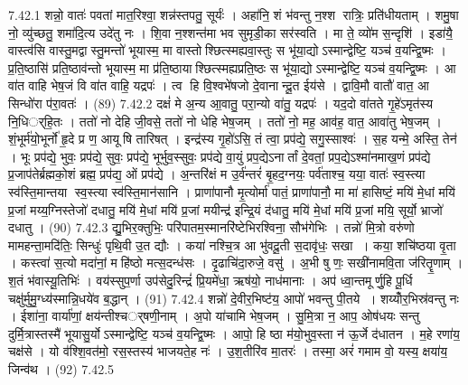 7.42.1
शन्नो॒ वातः॑ पवतां मात॒रिश्वा॒ शन्न॑स्तपतु॒ सूर्यः॑ । अहा॑नि॒ शं भ॑वन्तु न॒श्श रात्रिः॒ प्रति॑धीयताम् । शमु॒षा नो॒ व्यु॑च्छतु॒ शमा॑दि॒त्य उदे॑तु नः । शि॒वा न॒श्शन्त॑मा भव सुमृडी॒का सर॑स्वति । मा ते॒ व्यो॑म स॒न्दृशि॑ । इडा॑यै॒ वास्त्व॑सि वास्तु॒मद्वास्तु॒मन्तो॑ भूयास्म॒ मा वास्तोश्छित्स्मह्यवा॒स्तुः स भू॑या॒द्योऽस्मान्द्वेष्टि॒ यञ्च॑ व॒यन्द्वि॒ष्मः । प्र॒ति॒ष्ठासि॑ प्रति॒ष्ठाव॑न्तो भूयास्म॒ मा प्र॑ति॒ष्ठायाश्छित्स्मह्यप्रति॒ष्ठः स भू॑या॒द्योऽस्मान्द्वेष्टि॒ यञ्च॑ व॒यन्द्वि॒ष्मः । आ वा॑त वाहि भेष॒जं वि वा॑त वाहि॒ यद्रपः॑ । त्व हि वि॒श्वभे॑षजो दे॒वानान्दू॒त ईय॑से । द्वावि॒मौ वातौ॑ वात॒ आ सिन्धो॑रा प॑रा॒वतः॑ । (89)
7.42.2
दक्षं॑ मे अ॒न्य आ॒वातु॒ परा॒न्यो वा॑तु॒ यद्रपः॑ । यद॒दो वा॑तते गृ॒हे॑ऽमृत॑स्य नि॒धिर््हि॒तः । ततो॑ नो देहि जी॒वसे॒ ततो॑ नो धेहि भेष॒जम् । ततो॑ नो॒ मह॒ आव॑ह॒ वात॒ आवा॑तु भेष॒जम् । शं॒भूर्म॑यो॒भूर्नो॑ हृ॒दे प्र ण॒ आयूषि तारिषत् । इन्द्र॑स्य गृ॒हो॑ऽसि॒ तं त्वा॒ प्रप॑द्ये॒ सगु॒स्साश्वः॑ । स॒ह यन्मे॒ अस्ति॒ तेन॑ । भूः प्रप॑द्ये॒ भुवः॒ प्रप॑द्ये॒ सुवः॒ प्रप॑द्ये॒ भूर्भुव॒स्सुवः॒ प्रप॑द्ये वा॒युं प्रप॒द्येऽनार्तां दे॒वतां॒ प्रप॒द्येऽश्मा॑नमाख॒णं प्रप॑द्ये प्र॒जाप॑तेर्ब्रह्मको॒शं ब्रह्म॒ प्रप॑द्य॒ ओं प्रप॑द्ये । अ॒न्तरि॑क्षं म उ॒र्व॑न्तरं॑ बृ॒हद॒ग्नयः॒ पर्व॑ताश्च॒ यया॒ वातः॑ स्व॒स्त्या स्व॑स्ति॒मान्तया स्व॒स्त्या स्व॑स्ति॒मान॑सानि । प्राणा॑पानौ मृ॒त्योर्मा॑ पातं॒ प्राणा॑पानौ॒ मा मा॑ हासिष्टं॒ मयि॑ मे॒धां मयि॑ प्र॒जां मय्य॒ग्निस्तेजो॑ दधातु॒ मयि॑ मे॒धां मयि॑ प्र॒जां मयीन्द्र॑ इन्द्रि॒यं द॑धातु॒ मयि॑ मे॒धां मयि॑ प्र॒जां मयि॒ सूर्यो॒ भ्राजो॑ दधातु । (90)
7.42.3
द्यु॒भिर॒क्तुभिः॒ परि॑पातम॒स्मानरि॑ष्टेभिरश्विना॒ सौभ॑गेभिः । तन्नो॑ मि॒त्रो वरु॑णो मामहन्ता॒मदि॑तिः॒ सिन्धुः॑ पृथि॒वी उ॒त द्यौः । कया॑ नश्चि॒त्र आ भु॑वदू॒ती स॒दावृ॑धः॒ सखा । कया॒ शचि॑ष्ठया वृ॒ता । कस्त्वा॑ स॒त्यो मदा॑नां॒ महि॑ष्ठो मत्स॒दन्ध॑सः । दृ॒ढाचि॑दा॒रुजे॒ वसु॑ । अ॒भी षु णः॒ सखी॑नामवि॒ता ज॑रितॄ॒णाम् । श॒तं भ॑वास्यू॒तिभिः॑ । वय॑स्सुप॒र्णा उप॑सेदु॒रिन्द्रं॑ प्रि॒यमे॑धा॒ ऋष॑यो॒ नाध॑मानाः । अप॑ ध्वा॒न्तमूर्णु॒हि पू॒र्धि चक्षु॑र्मुमु॒ग्ध्य॑स्मान्नि॒धये॑व ब॒द्धान् । (91)
7.42.4
शन्नो॑ दे॒वीर॒भिष्ट॑य॒ आपो॑ भवन्तु पी॒तये । शय्योँर॒भिस्र॑वन्तु नः । ईशा॑ना॒ वार्या॑णां॒ क्षय॑न्तीश्चर््षणी॒नाम् । अ॒पो या॑चामि भेष॒जम् । सु॒मि॒त्रा न॒ आप॒ ओष॑धयः सन्तु दुर्मि॒त्रास्तस्मै॑ भूयासु॒र्योऽस्मान्द्वेष्टि॒ यञ्च॑ व॒यन्द्वि॒ष्मः । आपो॒ हि ष्ठा म॑यो॒भुव॒स्ता न॑ ऊ॒र्जे द॑धातन । म॒हे रणा॑य॒ चक्ष॑से । यो व॑श्शि॒वत॑मो॒ रस॒स्तस्य॑ भाजयते॒ह नः॑ । उ॒श॒तीरि॑व मा॒तरः॑ । तस्मा॒ अरं॑ गमाम वो॒ यस्य॒ क्षया॑य॒ जिन्व॑थ । (92)
7.42.5
